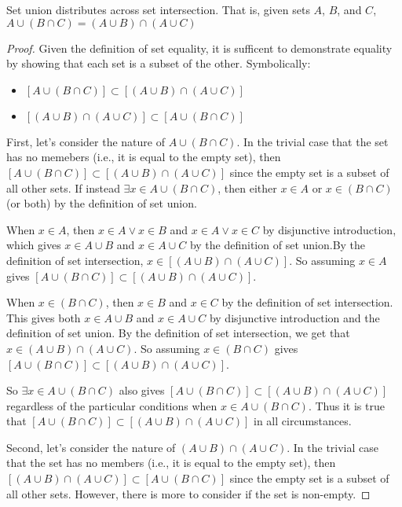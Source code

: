 \documentclass[main.tex]{subfiles}
\begin{document}
\begin{thm}
	Set union distributes across set intersection. That is, given sets
	\(A\), \(B\), and \(C\),
	\(A \cup (B \cap C) = (A \cup B) \cap (A \cup C)\)
\end{thm}
\begin{proof}
	Given the definition of set equality, it is sufficent to demonstrate
	equality by showing that each set is a subset of the other. Symbolically:
	\begin{itemize}
		\item \([A \cup (B \cap C)] \subset [(A \cup B) \cap (A \cup C)]\)
		\item \([(A \cup B) \cap (A \cup C)] \subset [A \cup (B \cap C)]\)
	\end{itemize}

	\medskip
	First, let's consider the nature of \(A \cup (B \cap C)\). In the
	trivial case that the set has no memebers (i.e., it is equal to the
	empty set), then
	\([A \cup (B \cap C)] \subset [(A \cup B) \cap (A \cup C)]\) since the
	empty set is a subset of all other sets. If instead
	\(\exists x \in A \cup (B \cap C)\), then either \(x \in A\) or
	\(x \in (B \cap C)\) (or both) by the definition of set union.

	When \(x \in A\), then \(x \in A \lor x \in B\) and
	\(x \in A \lor x \in C\) by disjunctive introduction, which gives
	\(x \in A \cup B\) and \(x \in A \cup C\) by the definition of set
	union.By the definition of set intersection,
	\(x \in [(A \cup B) \cap (A \cup C)]\). So assuming \(x \in A\) gives
	\([A \cup (B \cap C)] \subset [(A \cup B) \cap (A \cup C)]\).

	When \(x \in (B \cap C)\), then \(x \in B\) and \(x \in C\) by the
	definition of set intersection. This gives both \(x \in A \cup B\) and
	\(x \in A \cup C\) by disjunctive introduction and the definition of set
	union. By the definition of set intersection, we get that
	\(x \in (A \cup B) \cap (A \cup C)\). So assuming \(x \in (B \cap C)\)
	gives \([A \cup (B \cap C)] \subset [(A \cup B) \cap (A \cup C)]\).

	So \(\exists x \in A \cup (B \cap C)\) also gives
	\([A \cup (B \cap C)] \subset [(A \cup B) \cap (A \cup C)]\) regardless
	of the particular conditions when \(x \in A \cup (B \cap C)\). Thus it
	is true that \([A \cup (B \cap C)] \subset [(A \cup B) \cap (A \cup C)]\)
	in all circumstances.

	\medskip
	Second, let's consider the nature of \((A \cup B) \cap (A \cup C)\). In
	the trivial case that the set has no members (i.e., it is equal to the
	empty set), then
	\([(A \cup B) \cap (A \cup C)] \subset [A \cup (B \cap C)]\) since the
	empty set is a subset of all other sets. However, there is more to
	consider if the set is non-empty.


\end{proof}
\end{document}
